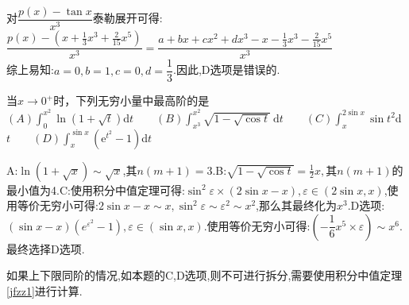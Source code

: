 \documentclass[8pt a4paper, oneside, UTF8]{ctexbook}
\begin{document}
\begin{sloppypar}
    \begin{solution}
        对$\dfrac{p(x)-\tan x}{x^3}$泰勒展开可得:$\dfrac{p(x)-(x+\frac13x^3+\frac2{15}x^5)}{x^3}=\dfrac{a+bx+cx^2+dx^3-x-\frac{1}{3}x^3-\frac{2}{15}x^5}{x^3}$\\
        综上易知:$a=0,b=1,c=0,d=\dfrac{1}{3}$.因此,D选项是错误的.
    \end{solution}
    \begin{problem}
        当$x\to0^+$时，下列无穷小量中最高阶的是 \\
        $(A)\int _0^{x^2}\ln ( 1+ {\sqrt {t}}) $d$t \qquad (B) \int_{x^{3}}^{x^{2}}\sqrt{1-\sqrt{\cos t}}\:\mathrm{d}t \qquad (C)\int _x^{2\sin x}\sin t^2$d$t \qquad (D) \int _x^{\sin x}( \mathrm{e} ^{t^2}- 1) $d$t$  
    \end{problem}
    \begin{solution}
        A:$\ln(1+\sqrt{x}) \sim \sqrt{x}$,其$n(m+1)=3$.B:$\sqrt{1-\sqrt{\cos t}}=\frac{1}{2}x,$其$n(m+1)$的最小值为4.C:使用积分中值定理可得:$\sin^2 \varepsilon \times (2\sin x- x),\varepsilon \in (2\sin x,x)$,使用等价无穷小可得:$2\sin x-x \sim x,\sin^2 \varepsilon \sim \varepsilon ^2 \sim x^2$,那么其最终化为$x^3$.D选项:$(\sin x - x)(e^{\varepsilon ^2}-1),\varepsilon \in (\sin x,x)$.使用等价无穷小可得:$(-\dfrac{1}{6}x^5 \times \varepsilon)\sim x^6$. 最终选择D选项.
    \end{solution}
    \begin{note}
        如果上下限同阶的情况,如本题的C,D选项,则不可进行拆分,需要使用积分中值定理\ref{jfzz1}进行计算.
    \end{note}

\end{sloppypar}
\end{document}
